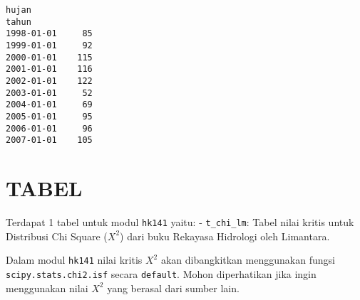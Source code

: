 \documentclass[11pt]{article}
\makeatletter
\newcommand{\boxspacing}{\kern\kvtcb@left@rule\kern\kvtcb@boxsep}
\newcommand{\prompt}[4]{
        {\ttfamily\llap{{\color{#2}[#3]:\hspace{3pt}#4}}\vspace{-\baselineskip}}
    }
\makeatother
\begin{document}
            \begin{tcolorbox}[breakable, size=fbox, boxrule=.5pt, pad at break*=1mm, opacityfill=0]
\prompt{Out}{outcolor}{ }{\boxspacing}
\begin{Verbatim}[commandchars=\\\{\}]
            hujan
tahun
1998-01-01     85
1999-01-01     92
2000-01-01    115
2001-01-01    116
2002-01-01    122
2003-01-01     52
2004-01-01     69
2005-01-01     95
2006-01-01     96
2007-01-01    105
\end{Verbatim}
\end{tcolorbox}
        
    \hypertarget{tabel}{%
\section{TABEL}\label{tabel}}

Terdapat 1 tabel untuk modul \texttt{hk141} yaitu: -
\texttt{t\_chi\_lm}: Tabel nilai kritis untuk Distribusi Chi Square
(\(X^2\)) dari buku Rekayasa Hidrologi oleh Limantara.

Dalam modul \texttt{hk141} nilai kritis \(X^2\) akan dibangkitkan
menggunakan fungsi \texttt{scipy.stats.chi2.isf} secara
\texttt{default}. Mohon diperhatikan jika ingin menggunakan nilai
\(X^2\) yang berasal dari sumber lain.
\end{document}

